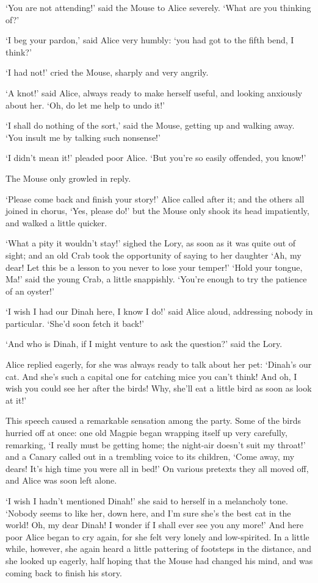\documentclass[statementpaper,twoside,openany]{memoir}
\begin{document}
`You are not attending!' said the Mouse to Alice severely. `What are you thinking of?'

`I beg your pardon,' said Alice very humbly: `you had got to the fifth bend, I think?'

`I had not!' cried the Mouse, sharply and very angrily.

`A knot!' said Alice, always ready to make herself useful, and looking anxiously about her. `Oh, do let me help to undo it!'

`I shall do nothing of the sort,' said the Mouse, getting up and walking away. `You insult me by talking such nonsense!'

`I didn't mean it!' pleaded poor Alice. `But you're so easily offended, you know!'

The Mouse only growled in reply.

`Please come back and finish your story!' Alice called after it; and the others all joined in chorus, `Yes, please do!' but the Mouse only shook its head impatiently, and walked a little quicker.

`What a pity it wouldn't stay!' sighed the Lory, as soon as it was quite out of sight; and an old Crab took the opportunity of saying to her daughter `Ah, my dear! Let this be a lesson to you never to lose your temper!' `Hold your tongue, Ma!' said the young Crab, a little snappishly. `You're enough to try the patience of an oyster!'

`I wish I had our Dinah here, I know I do!' said Alice aloud, addressing nobody in particular. `She'd soon fetch it back!'

`And who is Dinah, if I might venture to ask the question?' said the Lory.

Alice replied eagerly, for she was always ready to talk about her pet: `Dinah's our cat. And she's such a capital one for catching mice you can't think! And oh, I wish you could see her after the birds! Why, she'll eat a little bird as soon as look at it!'

This speech caused a remarkable sensation among the party. Some of the birds hurried off at once: one old Magpie began wrapping itself up very carefully, remarking, `I really must be getting home; the night-air doesn't suit my throat!' and a Canary called out in a trembling voice to its children, `Come away, my dears! It's high time you were all in bed!' On various pretexts they all moved off, and Alice was soon left alone.

`I wish I hadn't mentioned Dinah!' she said to herself in a melancholy tone. `Nobody seems to like her, down here, and I'm sure she's the best cat in the world! Oh, my dear Dinah! I wonder if I shall ever see you any more!' And here poor Alice began to cry again, for she felt very lonely and low-spirited. In a little while, however, she again heard a little pattering of footsteps in the distance, and she looked up eagerly, half hoping that the Mouse had changed his mind, and was coming back to finish his story.
\end{document}
